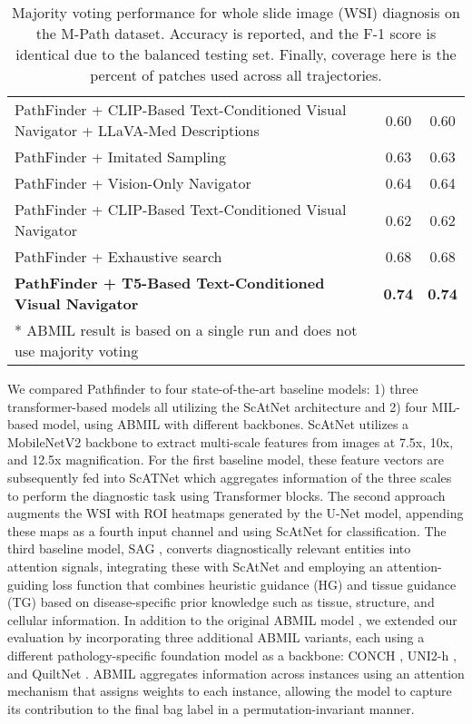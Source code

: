 \begin{table*}[h]
\begin{tabular}{lcc}
    PathFinder + CLIP-Based Text-Conditioned Visual Navigator + LLaVA-Med Descriptions & 0.60 & 0.60 \\
    PathFinder + Imitated Sampling & 0.63 & 0.63 \\
    PathFinder + Vision-Only Navigator & 0.64 & 0.64 \\
    PathFinder + CLIP-Based Text-Conditioned Visual Navigator & 0.62 & 0.62 \\
    PathFinder + Exhaustive search & 0.68 & 0.68 \\
    \textbf{PathFinder + T5-Based Text-Conditioned Visual Navigator} & \textbf{0.74} & \textbf{0.74} \\
    \bottomrule
    \vspace{1em}
  \tiny{* ABMIL result is based on a single run and does not use majority voting}
  \end{tabular}
  \caption{Majority voting performance for whole slide image (WSI) diagnosis on the M-Path dataset. Accuracy is reported, and the F-1 score is identical due to the balanced testing set. Finally, coverage here is the percent of patches used across all trajectories.}
  \label{tab:navigationdiagnosis}
\end{table*}



We compared Pathfinder to four state-of-the-art baseline models: 1) three transformer-based models all utilizing the ScAtNet architecture \cite{wu2021scale, ghezloo2024, liu2024semantics} and 2) four MIL-based model, using ABMIL \cite{ilse2018attention} with different backbones. ScAtNet utilizes a MobileNetV2 backbone \cite{sandler2018mobilenetv2} to extract multi-scale features from images at 7.5x, 10x, and 12.5x magnification. For the first baseline model, these feature vectors are subsequently fed into ScATNet which aggregates information of the three scales to perform the diagnostic task using Transformer blocks. The second approach \cite{ghezloo2024} augments the WSI with ROI heatmaps generated by the U-Net model, appending these maps as a fourth input channel and using ScAtNet for classification. The third baseline model, SAG \cite{liu2024semantics}, converts diagnostically relevant entities into attention signals, integrating these with ScAtNet and employing an attention-guiding loss function that combines heuristic guidance (HG) and tissue guidance (TG) based on disease-specific prior knowledge such as tissue, structure, and cellular information. In addition to the original ABMIL model \cite{ilse2018attention}, we extended our evaluation by incorporating three additional ABMIL variants, each using a different pathology-specific foundation model as a backbone: CONCH \cite{conch}, UNI2-h \cite{uni}, and QuiltNet \cite{ikezogwo2023quilt}. ABMIL aggregates information across instances using an attention mechanism that assigns weights to each instance, allowing the model to capture its contribution to the final bag label in a permutation-invariant manner.

